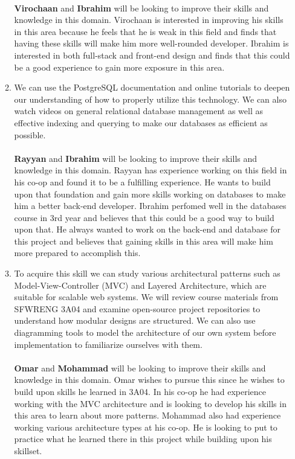\begin{enumerate}
\begin{enumerate}
    \\
    \textbf{Virochaan} and \textbf{Ibrahim} will be looking to improve their skills and knowledge in this domain. Virochaan is interested in improving his skills in this area because he feels that he is weak in this field and finds that having these skills will make him more well-rounded developer. Ibrahim is interested in both full-stack and front-end design and finds that this could be a good experience to gain more exposure in this area.  \\
    \item  We can use the PostgreSQL documentation and online tutorials to deepen our understanding of how to properly utilize this technology. We can also watch videos on general relational database management as well as effective indexing and querying to make our databases as efficient as possible. \\
    \\
    \textbf{Rayyan} and \textbf{Ibrahim} will be looking to improve their skills and knowledge in this domain. Rayyan has experience working on this field in his co-op and found it to be a fulfilling experience. He wants to build upon that foundation and gain more skills working on databases to make him a better back-end developer. Ibrahim perfomed well in the databases course in 3rd year and believes that this could be a good way to build upon that. He always wanted to work on the back-end and database for this project and believes that gaining skills in this area will make him more prepared to accomplish this.\\
    \item To acquire this skill we can study various architectural patterns such as Model-View-Controller (MVC) and Layered Architecture, which are suitable for scalable web systems. We will review course materials from SFWRENG 3A04 and examine open-source project repositories to understand how modular designs are structured. We can also use diagramming tools to model the architecture of our own system before implementation to familiarize ourselves with them. \\
    \\
    \textbf{Omar} and \textbf{Mohammad} will be looking to improve their skills and knowledge in this domain. Omar wishes to pursue this since he wishes to build upon skills he learned in 3A04. In his co-op he had experience working with the MVC architecture and is looking to develop his skills in this area to learn about more patterns. Mohammad also had experience working various architecture types at his co-op. He is looking to put to practice what he learned there in this project while building upon his skillset.\\
  \end{enumerate}
\end{enumerate}

